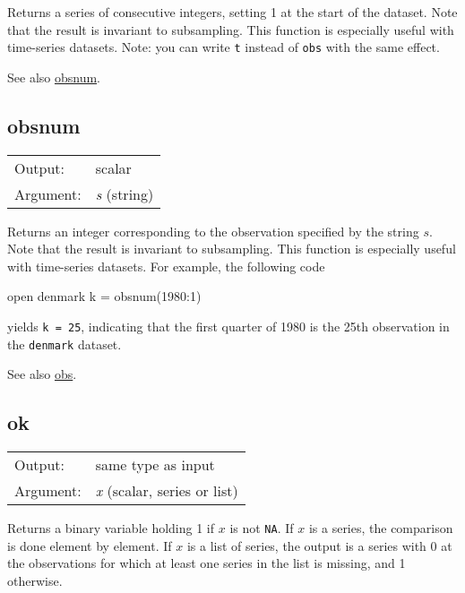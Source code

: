 	  Returns a series of consecutive integers, setting 1 at the start
	  of the dataset. Note that the result is invariant to
	  subsampling. This function is especially useful with time-series
	  datasets. Note: you can write \texttt{t} instead of
	  \texttt{obs} with the same effect.

	  See also \hyperlink{func-obsnum}{obsnum}.

\subsection{obsnum}
\hypertarget{func-obsnum}{}

\begin{tabular}{ll}
Output:     & scalar\\
Argument:   & \textsl{s} (string)\\
\end{tabular}

	  Returns an integer corresponding to the observation specified by
	  the string \ensuremath{s}. Note that the result is invariant to
	  subsampling. This function is especially useful with time-series
	  datasets.  For example, the following code

\begin{code}
	  open denmark 
	  k = obsnum(1980:1)

\end{code}

	  yields \texttt{k = 25}, indicating that the first quarter of
	  1980 is the 25th observation in the \texttt{denmark} dataset.

	  See also \hyperlink{func-obs}{obs}.

\subsection{ok}
\hypertarget{func-ok}{}

\begin{tabular}{ll}
Output:     & same type as input\\
Argument:   & \textsl{x} (scalar, series or list)\\
\end{tabular}

	  Returns a binary variable holding 1 if \ensuremath{x} is not
	  \texttt{NA}. If \ensuremath{x} is a series, the comparison is
	  done element by element. If \ensuremath{x} is a list of series,
	  the output is a series with 0 at the observations for which at
	  least one series in the list is missing, and 1 otherwise.

